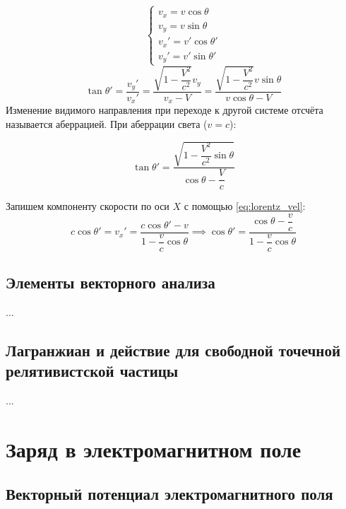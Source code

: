 \documentclass{article}
\begin{document}
\begin{equation*}
    \begin{cases}
    v_x=v\cos{\theta}\\
    v_y=v\sin{\theta}\\
    v_x'=v'\cos{\theta'}\\
    v_y'=v'\sin{\theta'}
    \end{cases}
\end{equation*}
\begin{equation*}
    \tan{\theta'}=\dfrac{v_y'}{v_x'}=\dfrac{\sqrt{1-\dfrac{V^2}{c^2}}v_y}{v_x-V}=\dfrac{\sqrt{1-\dfrac{V^2}{c^2}}v\sin{\theta}}{v\cos{\theta}-V}
\end{equation*}
Изменение видимого направления при переходе к другой системе отсчёта называется аберрацией. При аберрации света ($v=c$):

\begin{equation*}
    \tan{\theta'}=\dfrac{\sqrt{1-\dfrac{V^2}{c^2}\sin{\theta}}}{\cos{\theta}-\dfrac{V}{c}}
\end{equation*}

Запишем компоненту скорости по оси $X$ с помощью \eqref{eq:lorentz_vel}:
\begin{equation*}
    c\cos{\theta'}=v_x'=\dfrac{c\cos{\theta'}-v}{1-\dfrac{v}{c}\cos{\theta}}
    \implies \cos{\theta'}=\dfrac{\cos{\theta}-\dfrac{v}{c}}{1-\dfrac{v}{c}\cos{\theta}}
\end{equation*}

\subsection{Элементы векторного анализа}

...

\subsection{Лагранжиан и действие для свободной точечной релятивистской частицы}

...

\section{Заряд в электромагнитном поле}

\subsection{Векторный потенциал электромагнитного поля}
\end{document}
